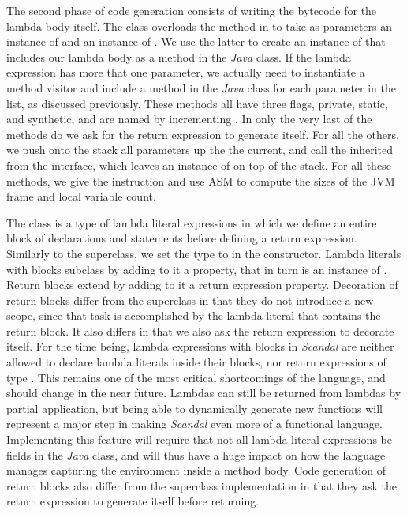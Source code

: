 The second phase of code generation consists of writing the bytecode for the lambda body itself. The  class overloads the  method in  to take as parameters an instance of  and an instance of . We use the latter to create an instance of  that includes our lambda body as a method in the \emph{Java} class. If the lambda expression has more that one parameter, we actually need to instantiate a method visitor and include a method in the \emph{Java} class for each parameter in the list, as discussed previously. These methods all have three flags, private, static, and synthetic, and are named by incrementing . In only the very last of the methods do we ask for the return expression to generate itself. For all the others, we push onto the stack all parameters up the the current, and call the  inherited from the  interface, which leaves an instance of  on top of the stack. For all these methods, we give the  instruction and use ASM to compute the sizes of the JVM frame and local variable count.

The  class is a type of lambda literal expressions in which we define an entire block of declarations and statements before defining a return expression. Similarly to the superclass, we set the type to  in the constructor. Lambda literals with blocks subclass  by adding to it a  property, that in turn is an instance of . Return blocks extend  by adding to it a return expression property. Decoration of return blocks differ from the superclass in that they do not introduce a new scope, since that task is accomplished by the lambda literal that contains the return block. It also differs in that we also ask the return expression to decorate itself. For the time being, lambda expressions with blocks in \emph{Scandal} are neither allowed to declare lambda literals inside their blocks, nor return expressions of type . This remains one of the most critical shortcomings of the language, and should change in the near future. Lambdas can still be returned from lambdas by partial application, but being able to dynamically generate new functions will represent a major step in making \emph{Scandal} even more of a functional language. Implementing this feature will require that not all lambda literal expressions be fields in the \emph{Java} class, and will thus have a huge impact on how the language manages capturing the environment inside a method body. Code generation of return blocks also differ from the superclass implementation in that they ask the return expression to generate itself before returning.

